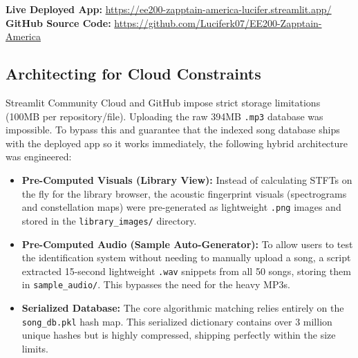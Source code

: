\documentclass[12pt,a4paper]{article}
\begin{document}
\begin{result_box}
\textbf{Live Deployed App:} \href{https://ee200-zapptain-america-lucifer.streamlit.app/}{https://ee200-zapptain-america-lucifer.streamlit.app/} \\
\textbf{GitHub Source Code:} \href{https://github.com/Luciferk07/EE200-Zapptain-America}{https://github.com/Luciferk07/EE200-Zapptain-America}
\end{result_box}

\subsection{Architecting for Cloud Constraints}
Streamlit Community Cloud and GitHub impose strict storage limitations (100MB per repository/file). Uploading the raw 394MB \texttt{.mp3} database was impossible. To bypass this and guarantee that the indexed song database ships with the deployed app so it works immediately, the following hybrid architecture was engineered:

\begin{itemize}
    \item \textbf{Pre-Computed Visuals (Library View):} Instead of calculating STFTs on the fly for the library browser, the acoustic fingerprint visuals (spectrograms and constellation maps) were pre-generated as lightweight \texttt{.png} images and stored in the \texttt{library\_images/} directory.
    \item \textbf{Pre-Computed Audio (Sample Auto-Generator):} To allow users to test the identification system without needing to manually upload a song, a script extracted 15-second lightweight \texttt{.wav} snippets from all 50 songs, storing them in \texttt{sample\_audio/}. This bypasses the need for the heavy MP3s.
    \item \textbf{Serialized Database:} The core algorithmic matching relies entirely on the \texttt{song\_db.pkl} hash map. This serialized dictionary contains over 3 million unique hashes but is highly compressed, shipping perfectly within the size limits.
\end{itemize}
\end{document}
